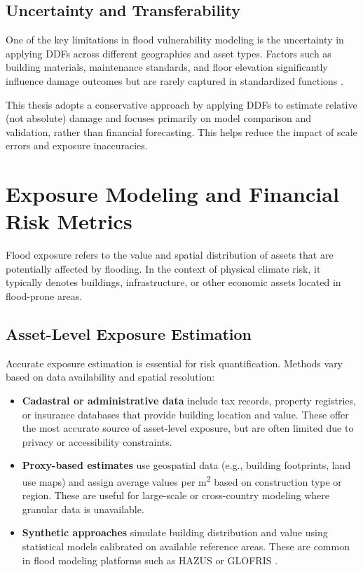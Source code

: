 \subsection{Uncertainty and Transferability}

One of the key limitations in flood vulnerability modeling is the uncertainty in applying DDFs across different geographies and asset types. Factors such as building materials, maintenance standards, and floor elevation significantly influence damage outcomes but are rarely captured in standardized functions \cite{bressan_asset-level_2024}.

This thesis adopts a conservative approach by applying DDFs to estimate relative (not absolute) damage and focuses primarily on model comparison and validation, rather than financial forecasting. This helps reduce the impact of scale errors and exposure inaccuracies.


\section{Exposure Modeling and Financial Risk Metrics}

Flood exposure refers to the value and spatial distribution of assets that are potentially affected by flooding. In the context of physical climate risk, it typically denotes buildings, infrastructure, or other economic assets located in flood-prone areas.

\subsection{Asset-Level Exposure Estimation}

Accurate exposure estimation is essential for risk quantification. Methods vary based on data availability and spatial resolution:

\begin{itemize}
    \item \textbf{Cadastral or administrative data} include tax records, property registries, or insurance databases that provide building location and value. These offer the most accurate source of asset-level exposure, but are often limited due to privacy or accessibility constraints.

    \item \textbf{Proxy-based estimates} use geospatial data (e.g., building footprints, land use maps) and assign average values per m\textsuperscript{2} based on construction type or region. These are useful for large-scale or cross-country modeling where granular data is unavailable.

    \item \textbf{Synthetic approaches} simulate building distribution and value using statistical models calibrated on available reference areas. These are common in flood modeling platforms such as HAZUS or GLOFRIS \cite{scawthorn_hazus-mh_2006, ward_assessing_2013}.
\end{itemize}

